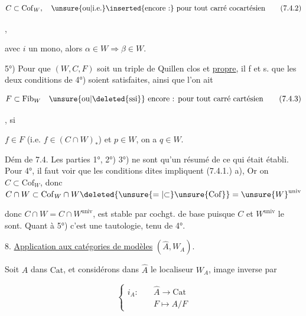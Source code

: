\[
C\subset\mathrm{Cof}_W,\quad \unsure{\text{ou}|\text{i.e.}}\inserted{\text{encore :}}\ \text{pour tout carré cocartésien}\tag*{(7.4.2)}
\]

,

avec $i$ un mono, alors $\alpha\in W\Longrightarrow\beta\in W$.

5°) Pour que $(W,C,F)$ soit un triple de Quillen clos et \uline{propre}, il f et s. que les deux conditions de 4°) soient satisfaites, ainsi que l'on ait

\[
F\subset\mathrm{Fib}_W\quad\unsure{\text{ou}|\text{\deleted{ssi}}}\ \text{encore : pour tout carré cartésien}\tag*{(7.4.3)}
\]

, si

$f\in F$ (i.e. $f\in(C\cap W)_*$) et $p\in W$, on a $q\in W$.

Dém de 7.4. Les parties 1°, 2°) 3°) ne sont qu'un résumé de ce qui était établi. Pour 4°, il faut voir que les conditions dites impliquent (7.4.1.) a), Or on  $C\subset\mathrm{Cof}_W$, donc $C\cap W\subset\mathrm{Cof}_W\cap W\deleted{\unsure{=|{\subset}}\unsure{\mathrm{Cof}}}=\unsure{W}^{\mathrm{univ}}$ 


donc $C\cap W=C\cap W^{\mathrm{univ}}$,   est stable par cochgt. de base puisque $C$ et $W^{\mathrm{univ}}$ le sont. Quant à 5°) c'est une tautologie,  tenu de 4°.

8. \uline{Application aux catégories de modèles} $(\widehat A,W_A)$.

Soit $A$ dans $\mathrm{Cat}$, et considérons dans $\widehat A$ le localiseur $W_A$, image inverse par

\[
\left\{\begin{aligned}i_A:\quad&\widehat A\longrightarrow\mathrm{Cat}\\&F\longmapsto A/F\end{aligned}\right.\tag*{(8.1.)}
\]

